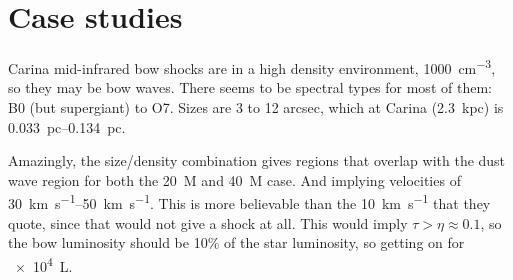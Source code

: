 \section{Case studies}
\label{sec:case-studies}

Carina mid-infrared bow shocks \citep{Sexton:2015b} are in a high
density environment, \SI{1000}{cm^{-3}}, so they may be bow waves.
There seems to be spectral types for most of them: B0 (but supergiant)
to O7.  Sizes are 3 to 12 arcsec, which at Carina (\SI{2.3}{kpc}) is
\SIrange{0.033}{0.134}{pc}.

Amazingly, the size/density combination gives regions that overlap
with the dust wave region for both the \SI{20}{M_\odot} and \SI{40}{M_\odot}
case.  And implying velocities of \SIrange{30}{50}{km.s^{-1}}.  This
is more believable than the \SI{10}{km.s^{-1}} that they quote, since
that would not give a shock at all.  This would imply
\(\tau > \eta \approx 0.1\), so the bow luminosity should be 10\% of the star
luminosity, so getting on for \SI{e4}{L_\odot}.


